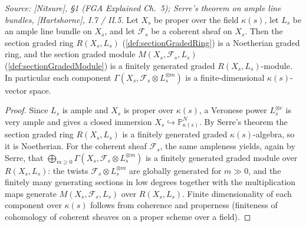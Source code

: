 \begin{lemma}
  \label{lem:sectionGradedModule_fg}
  \textit{Source: [Nitsure], \S 1 (FGA Explained Ch.~5); Serre's theorem on
  ample line bundles, [Hartshorne], I.7 / II.5.}
  Let \(X_s\) be proper over the field \(\kappa(s)\), let \(L_s\) be an ample line
  bundle on \(X_s\), and let \(\mathcal{F}_s\) be a coherent sheaf on \(X_s\).
  Then the section graded ring \(R(X_s, L_s)\) (\cref{def:sectionGradedRing}) is a
  Noetherian graded ring, and the section graded module
  \(M(X_s, \mathcal{F}_s, L_s)\) (\cref{def:sectionGradedModule}) is a finitely
  generated graded \(R(X_s, L_s)\)-module. In particular each component
  \(\Gamma(X_s, \mathcal{F}_s \otimes L_s^{\otimes m})\) is a finite-dimensional
  \(\kappa(s)\)-vector space.
\end{lemma}

\begin{proof}
  Since \(L_s\) is ample and \(X_s\) is proper over \(\kappa(s)\), a Veronese
  power \(L_s^{\otimes e}\) is very ample and gives a closed immersion
  \(X_s \hookrightarrow \mathbb{P}^N_{\kappa(s)}\). By Serre's theorem the section
  graded ring \(R(X_s, L_s)\) is a finitely generated graded
  \(\kappa(s)\)-algebra, so it is Noetherian. For the coherent sheaf
  \(\mathcal{F}_s\), the same ampleness yields, again by Serre, that
  \(\bigoplus_{m \ge 0} \Gamma(X_s, \mathcal{F}_s \otimes L_s^{\otimes m})\) is a
  finitely generated graded module over \(R(X_s, L_s)\): the twists
  \(\mathcal{F}_s \otimes L_s^{\otimes m}\) are globally generated for
  \(m \gg 0\), and the finitely many generating sections in low degrees together
  with the multiplication maps generate \(M(X_s, \mathcal{F}_s, L_s)\) over
  \(R(X_s, L_s)\). Finite dimensionality of each component over \(\kappa(s)\)
  follows from coherence and properness (finiteness of cohomology of coherent
  sheaves on a proper scheme over a field).
\end{proof}

